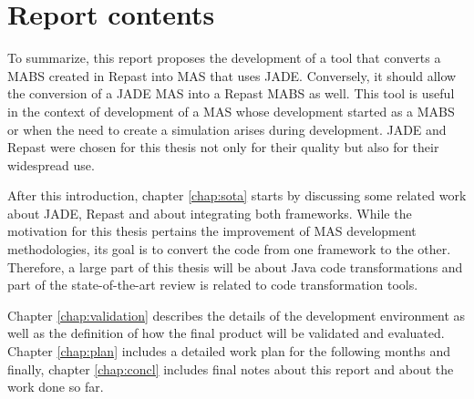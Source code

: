 \section{Report contents} \label{sec:struct}

To summarize, this report proposes the development of a tool that converts a MABS created in Repast into MAS that uses JADE. Conversely, it should allow the conversion of a JADE MAS into a Repast MABS as well. This tool is useful in the context of development of a MAS whose development started as a MABS or when the need to create a simulation arises during development. JADE and Repast were chosen for this thesis not only for their quality but also for their widespread use.

After this introduction, chapter \ref{chap:sota} starts by discussing some related work about JADE, Repast and about integrating both frameworks. While the motivation for this thesis pertains the improvement of MAS development methodologies, its goal is to convert the code from one framework to the other. Therefore, a large part of this thesis will be about Java code transformations and part of the state-of-the-art review is related to code transformation tools.

Chapter \ref{chap:validation} describes the details of the development environment as well as the definition of how the final product will be validated and evaluated. Chapter \ref{chap:plan} includes a detailed work plan for the following months and finally, chapter \ref{chap:concl} includes final notes about this report and about the work done so far.